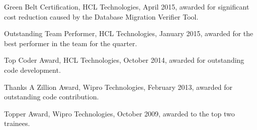 \documentclass[margin]{resume}
\begin{document}
\begin{resume}
\begin{list2}
\item Green Belt Certification, HCL Technologies, April 2015, awarded for
significant cost reduction caused by the Database Migration Verifier Tool.

\item Outstanding Team Performer, HCL Technologies, January 2015, awarded for the
best performer in the team for the quarter.

\item Top Coder Award, HCL Technologies, October 2014, awarded for outstanding
code development.

\item Thanks A Zillion Award, Wipro Technologies, February 2013, awarded for
outstanding code contribution.

\item Topper Award, Wipro Technologies, October 2009, awarded to the top two
trainees.

\end{list2}

\end{resume}
\end{document}
